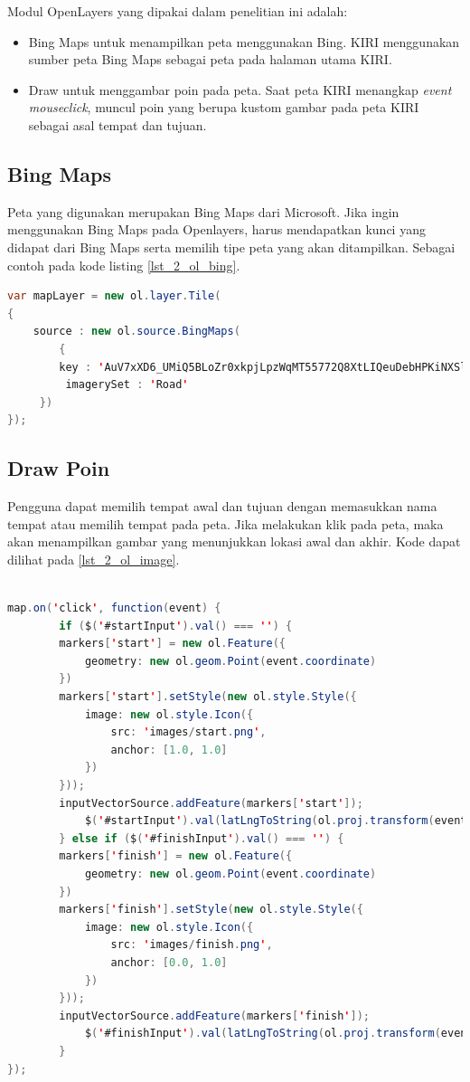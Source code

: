Modul OpenLayers yang dipakai dalam penelitian ini adalah:
\begin{itemize}
	\item 	Bing Maps untuk menampilkan peta menggunakan Bing. KIRI menggunakan sumber peta Bing Maps sebagai peta pada halaman utama KIRI. 
	\item Draw untuk menggambar poin pada peta. Saat peta KIRI menangkap \textit{event mouseclick}, muncul poin yang berupa kustom gambar pada peta KIRI sebagai asal tempat dan tujuan. 
\end{itemize}

\subsection{Bing Maps}
Peta yang digunakan merupakan Bing Maps dari Microsoft. Jika ingin menggunakan Bing Maps pada Openlayers, harus mendapatkan kunci yang didapat dari Bing Maps serta memilih tipe peta yang akan ditampilkan. Sebagai contoh pada kode listing \ref{lst_2_ol_bing}.

\begin{lstlisting}[caption=Penggunaan Bing Maps pada Openlayers,label = {lst_2_ol_bing},language=Java]
var mapLayer = new ol.layer.Tile(
{
	source : new ol.source.BingMaps(
    	{
     	key : 'AuV7xXD6_UMiQ5BLoZr0xkpjLpzWqMT55772Q8XtLIQeuDebHPKiNXSlZXxEr1GA',
         imagerySet : 'Road'
     })
});
\end{lstlisting}

\subsection{Draw Poin}
Pengguna dapat memilih tempat awal dan tujuan dengan memasukkan nama tempat atau memilih tempat pada peta. Jika melakukan klik pada peta, maka akan menampilkan gambar yang menunjukkan lokasi awal dan akhir. Kode dapat dilihat pada \ref{lst_2_ol_image}. 

\begin{lstlisting}[caption=Menambahkan klik pada peta,label = {lst_2_ol_image},language=Java]

map.on('click', function(event) {
    	if ($('#startInput').val() === '') {
		markers['start'] = new ol.Feature({
			geometry: new ol.geom.Point(event.coordinate)
		})
		markers['start'].setStyle(new ol.style.Style({
			image: new ol.style.Icon({
				src: 'images/start.png',
				anchor: [1.0, 1.0]
			})
		}));
		inputVectorSource.addFeature(markers['start']);
    		$('#startInput').val(latLngToString(ol.proj.transform(event.coordinate, 'EPSG:3857', 'EPSG:4326')));
    	} else if ($('#finishInput').val() === '') {
		markers['finish'] = new ol.Feature({
			geometry: new ol.geom.Point(event.coordinate)
		})
		markers['finish'].setStyle(new ol.style.Style({
			image: new ol.style.Icon({
				src: 'images/finish.png',
				anchor: [0.0, 1.0]
			})
		}));
		inputVectorSource.addFeature(markers['finish']);
    		$('#finishInput').val(latLngToString(ol.proj.transform(event.coordinate, 'EPSG:3857', 'EPSG:4326')));
    	}
});


\end{lstlisting}

